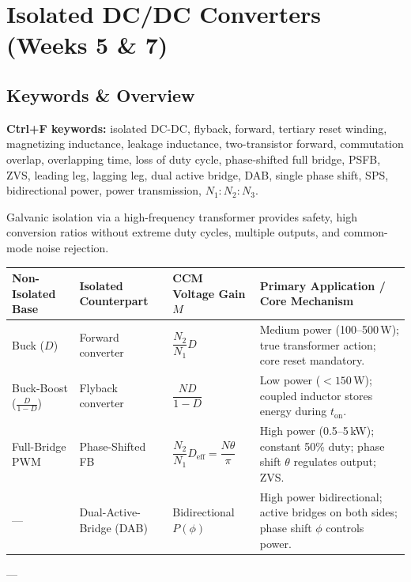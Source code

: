\section{Isolated DC/DC Converters (Weeks 5 \& 7)}

\subsection{Keywords \& Overview}
\noindent\textbf{Ctrl+F keywords:} isolated DC-DC, flyback, forward, tertiary reset winding, magnetizing inductance, leakage inductance, two-transistor forward, commutation overlap, overlapping time, loss of duty cycle, phase-shifted full bridge, PSFB, ZVS, leading leg, lagging leg, dual active bridge, DAB, single phase shift, SPS, bidirectional power, power transmission, $N_1:N_2:N_3$.

\vspace{0.5em}
\noindent Galvanic isolation via a high-frequency transformer provides safety, high conversion ratios without extreme duty cycles, multiple outputs, and common-mode noise rejection.

\begin{center}
\small
\begin{tabularx}{\textwidth}{@{} >{\raggedright\arraybackslash}p{2.8cm} >{\raggedright\arraybackslash}p{2.8cm} >{\raggedright\arraybackslash}p{2.6cm} >{\raggedright\arraybackslash}X @{}}
\toprule
\textbf{Non-Isolated Base} & \textbf{Isolated Counterpart} & \textbf{CCM Voltage Gain $M$} & \textbf{Primary Application / Core Mechanism} \\
\midrule
Buck ($D$) & Forward converter & $\dfrac{N_2}{N_1} D$ & Medium power (100--500\,W); true transformer action; core reset mandatory. \\
Buck-Boost ($\frac{D}{1-D}$) & Flyback converter & $\dfrac{N D}{1-D}$ & Low power ($<150$\,W); coupled inductor stores energy during $t_{\mathrm{on}}$. \\
Full-Bridge PWM & Phase-Shifted FB & $\dfrac{N_2}{N_1} D_{\mathrm{eff}} = \dfrac{N\theta}{\pi}$ & High power (0.5--5\,kW); constant 50\% duty; phase shift $\theta$ regulates output; ZVS. \\
--- & Dual-Active-Bridge (DAB) & Bidirectional $P(\phi)$ & High power bidirectional; active bridges on both sides; phase shift $\phi$ controls power. \\
\bottomrule
\end{tabularx}
\end{center}

---

